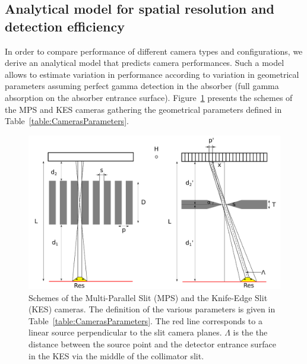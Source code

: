 \documentclass[a4paper,english,12pt]{article}
\begin{document}
\subsection{Analytical model for spatial resolution and detection efficiency}


In order to compare performance of different camera types and configurations, we derive an analytical model that predicts camera performances. Such a model allows to estimate variation in performance according to variation in geometrical parameters assuming perfect gamma detection in the absorber (full gamma absorption on the absorber entrance surface). Figure~\ref{fig:CamerasParameters} presents the schemes of the MPS and KES cameras gathering the geometrical parameters defined in Table~\ref{table:CamerasParameters}.

\begin{figure}[htbp]
    \centering
    \includegraphics[width=.8\textwidth]{MPS-KES_scheme}
    \caption{Schemes of the Multi-Parallel Slit (MPS) and the Knife-Edge Slit (KES) cameras. The definition of the various parameters is given in Table~\ref{table:CamerasParameters}. The red line corresponds to a linear source perpendicular to the slit camera planes. $\Lambda$ is the the distance between the source point and the detector entrance surface in the KES via the middle of the collimator slit.}
    \label{fig:CamerasParameters}
\end{figure}    
\end{document}
